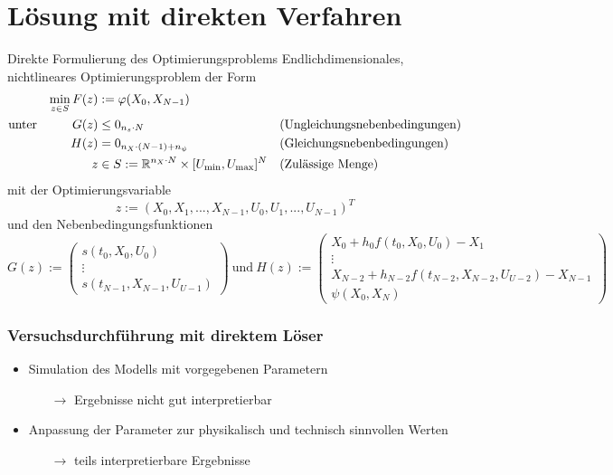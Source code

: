 \documentclass[aspectratio=169]{beamer}
\newcommand{\R}{\mathbb{R}}
\begin{document}
\section{Lösung mit direkten Verfahren}
\begin{frame}
  \begin{block}{Direkte Formulierung des Optimierungsproblems}
    \scriptsize
    Endlichdimensionales, nichtlineares Optimierungsproblem der Form
    \begin{align*}
        \min_{z \in S} F(z) &:= \varphi(X_0,X_{N-1}) & & \\
        \text{unter} \hspace{10mm} G(z) &\leq 0_{n_s \cdot N} & &  \text{(Ungleichungsnebenbedingungen)} \\
        H(z) &= 0_{n_X \cdot (N-1) + n_{\psi}} & & \text{(Gleichungsnebenbedingungen)}\\
        z &\in S := \R^{n_X \cdot N} \times [U_{\min},U_{\max}]^{N} & &  \text{(Zulässige Menge)}
    \end{align*}
    mit der Optimierungsvariable
    \begin{equation*}
        z := (X_0,X_1,...,X_{N-1},U_0,U_1,...,U_{N-1})^T
    \end{equation*}
    und den Nebenbedingungsfunktionen 
    \begin{equation*}
        G(z) := 
        \begin{pmatrix}
            s(t_0,X_0,U_0) \\ 
            \vdots \\ 
            s(t_{N-1},X_{N-1},U_{U-1})
        \end{pmatrix}
        \ \text{und}\ H(z) := 
        \begin{pmatrix}
            X_0 + h_0 f(t_0,X_0,U_0) - X_1 \\ 
            \vdots \\ 
            X_{N-2} + h_{N-2} f(t_{N-2},X_{N-2},U_{U-2}) - X_{N-1} \\
            \psi(X_0,X_N)
        \end{pmatrix} 
    \end{equation*}
    \end{block}
\end{frame}

\begin{frame}
  \frametitle{Versuchsdurchführung mit direktem Löser}
  \begin{itemize}
    \item Simulation des Modells mit vorgegebenen Parametern
    \begin{itemize}
      \item[\(\rightarrow\)] Ergebnisse nicht gut interpretierbar
    \end{itemize}
    \item Anpassung der Parameter zur physikalisch und technisch sinnvollen Werten
    \begin{itemize}
      \item[\(\rightarrow\)] teils interpretierbare Ergebnisse
    \end{itemize}
  \end{itemize}
\end{frame}
\end{document}
